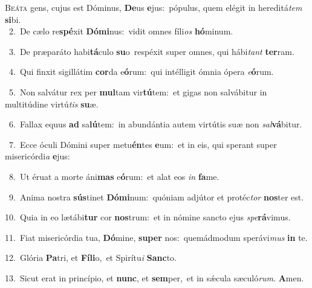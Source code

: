 \lettrine{\initial\textcolor{\initialcolor}{B}}{eáta} gens, cujus est Dóminus, \textbf{De}\-us \textbf{e}\-jus:~\star pópulus, quem elégit in hereditá\textit{tem} \textbf{si}\-bi.\\
{\numbfont\textcolor{\numbcolor}{~2.}}~De cælo re\-\textbf{spé}\-xit \textbf{Dó}\-\textbf{mi}nus:~\star vidit omnes fíli\textit{os} \textbf{hó}\-minum.\par
{\numbfont\textcolor{\numbcolor}{~3.}}~De præparáto habi\-\textbf{tá}\-culo \textbf{su}\-o~\star respéxit super omnes, qui hábi\textit{tant} \textbf{ter}\-ram.\par
{\numbfont\textcolor{\numbcolor}{~4.}}~Qui finxit sigillátim \textbf{cor}\-da e\-\textbf{ó}\-rum:~\star qui intélligit ómnia ópera \textit{e}\-\textbf{ó}rum.\par
{\numbfont\textcolor{\numbcolor}{~5.}}~Non salvátur rex per \textbf{mul}\-tam vir\-\textbf{tú}\-tem:~\star et gigas non salvábitur in multitúdine virtú\textit{tis} \textbf{su}\-æ.\par
{\numbfont\textcolor{\numbcolor}{~6.}}~Fallax equus \textbf{ad} sa\-\textbf{lú}\-tem:~\star in abundántia autem virtútis suæ non \textit{sal}\-\textbf{vá}bitur.\par
{\numbfont\textcolor{\numbcolor}{~7.}}~Ecce óculi Dómini super metu\-\textbf{én}\-tes \textbf{e}\-um:~\star et in eis, qui sperant super misericórdi\textit{a} \textbf{e}\-jus:\par
{\numbfont\textcolor{\numbcolor}{~8.}}~Ut éruat a morte áni\textbf{mas} e\-\textbf{ó}\-rum:~\star et alat eos \textit{in} \textbf{fa}\-me.\par
{\numbfont\textcolor{\numbcolor}{~9.}}~Anima nostra \textbf{sús}\-tinet \textbf{Dó}\-\textbf{mi}num:~\star quóniam adjútor et protéc\textit{tor} \textbf{nos}\-ter est.\par
{\numbfont\textcolor{\numbcolor}{10.}}~Quia in eo lætábi\textbf{tur} cor \textbf{nos}\-trum:~\star et in nómine sancto ejus \textit{spe}\-\textbf{rá}vimus.\par
{\numbfont\textcolor{\numbcolor}{11.}}~Fiat misericórdia tua, \textbf{Dó}\-mine, \textbf{su}\-\textbf{per} nos:~\star quemádmodum sperávi\textit{mus} \textbf{in} te.\par
{\numbfont\textcolor{\numbcolor}{12.}}~Glória \textbf{Pa}\-tri, et \textbf{Fí}\-\textbf{li}o,~\star et Spirítu\textit{i} \textbf{Sanc}\-to.\par
{\numbfont\textcolor{\numbcolor}{13.}}~Sicut erat in princípio, et \textbf{nunc}\-, et \textbf{sem}\-per,~\star et in sǽcula sæculó\-\textit{rum}\-. \textbf{A}\-men.\par
